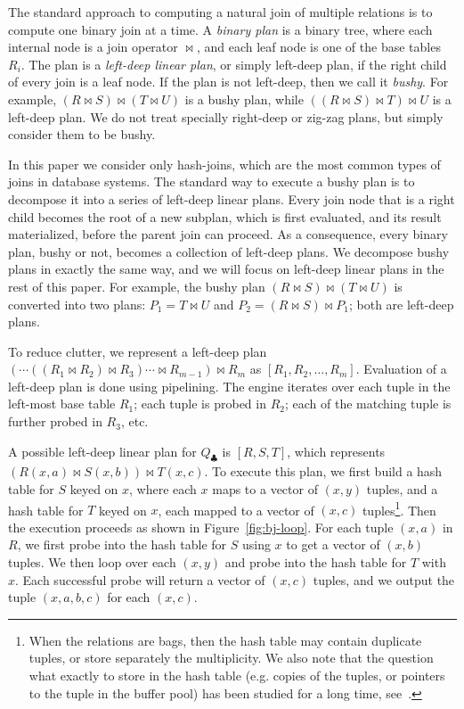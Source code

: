 The standard approach to computing a natural join of multiple relations is
to compute one binary join at a time.  A {\em binary plan} is a binary
tree, where each internal node is a join operator $\Join$, and each
leaf node is one of the base tables $R_i$.
The plan is a \emph{left-deep linear plan}, or
simply left-deep plan, if the right child of every join is a leaf
node.  If the plan is not left-deep, then we call it \emph{bushy}.
For example, $(R \Join S) \Join (T \Join U)$ is a bushy plan, while
$((R \Join S) \Join T) \Join U$ is a left-deep plan.  We do not treat
specially right-deep or zig-zag plans, but simply consider them to be
bushy.

In this paper we consider only hash-joins, which are the most
common types of joins in database systems.
The standard way to execute a bushy plan is to
decompose it into a series of left-deep linear plans.  Every join node
that is a right child becomes the root of a new subplan, which is
first evaluated, and its result materialized, before the parent join
can proceed.  As a consequence, every binary plan, bushy or not,
becomes a collection of left-deep plans. We decompose bushy
plans in exactly the same way, and we will focus on left-deep linear
plans in the rest of this paper.  For example, the bushy plan
$(R \Join S) \Join (T \Join U)$ is converted into two plans:
$P_1 = T \Join U$ and $P_2 = (R \Join S) \Join P_1$; both are
left-deep plans.

To reduce clutter, we represent a left-deep plan
$(\cdots ((R_1 \Join R_2) \Join R_3) \cdots \Join R_{m-1}) \Join R_m$
as $[R_1, R_2, \ldots, R_m]$.  Evaluation of a left-deep plan is done
using pipelining.  The engine iterates over each tuple in the
left-most base table $R_1$; each tuple is probed in $R_2$; each of the
matching tuple is further probed in $R_3$, etc.


\begin{example}
  A possible left-deep linear plan for $Q_\clubsuit$ is $[R, S, T]$,
  which represents $\left(R(x,a) \Join S(x,b)\right) \Join T(x,c)$.  To execute
  this plan, we first build a hash table for $S$ keyed on $x$,
  where each $x$ maps to a vector of $(x,y)$ tuples,
  and a hash table for $T$ keyed on $x$, each mapped to a
  vector of $(x,c)$ tuples\footnote{When the relations are bags, then
    the hash table may contain duplicate tuples, or store separately
    the multiplicity.  We also note that the question what exactly to
    store in the hash table (e.g. copies of the tuples, or pointers to
    the tuple in the buffer pool) has been studied for a long time,
    see~\cite{DBLP:journals/csur/Graefe93}.}.
  Then the execution
  proceeds as shown in Figure~\ref{fig:bj-loop}.
  For each tuple $(x, a)$ in $R$, we first probe into the hash table for $S$
  using $x$ to get a vector of $(x, b)$ tuples.  We then loop over
  each $(x, y)$ and probe into the hash table for $T$ with $x$.
  Each successful probe will return a vector of $(x, c)$ tuples,
  and we output the tuple $(x, a, b, c)$ for each $(x, c)$.
\end{example}

